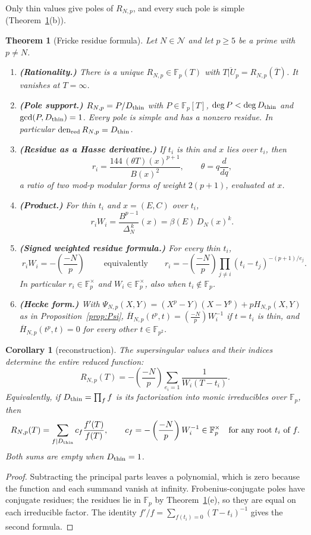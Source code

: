 \documentclass[11pt,a4paper]{article}
\numberwithin{equation}{section}
\newtheorem{corollary}[theorem]{Corollary}
\newtheorem{maintheorem}[theorem]{Theorem}
\theoremstyle{definition}
\theoremstyle{remark}
\newcommand{\Fp}{\mathbb F_p}
\newcommand{\Fq}{\mathbb F_{p^2}}
\newcommand{\den}{\operatorname{den}_{\mathrm{red}}}
\newcommand{\Lp}[1]{\left(\frac{#1}{p}\right)}
\begin{document}
Only thin values give poles of $R_{N,p}$, and every such pole is simple
(Theorem~\ref{thm:main}(b)).

\begin{maintheorem}[Fricke residue formula]\label{thm:main}
Let $N\in\mathcal N$ and let $p\ge5$ be a prime with $p\ne N$.
\begin{enumerate}[label=\textup{(\alph*)}]
\item \textbf{(Rationality.)} There is a unique $R_{N,p}\in\Fp(T)$ with $\overline{T|U_p}=R_{N,p}(\overline T)$. It vanishes at $T=\infty$.
\item \textbf{(Pole support.)} $R_{N,p}=P/D_{\rm thin}$ with $P\in\Fp[T]$,
$\deg P<\deg D_{\rm thin}$ and $\gcd(P,D_{\rm thin})=1$. Every pole is simple and has a nonzero residue. In particular $\den R_{N,p}=D_{\rm thin}$.
\item \textbf{(Residue as a Hasse derivative.)} If $t_i$ is thin and $x$ lies over $t_i$, then
\[
r_i=\frac{144\,(\theta T)(x)^{p+1}}{B(x)^2},\qquad \theta=q\frac{d}{dq},
\]
a ratio of two mod-$p$ modular forms of weight $2(p+1)$, evaluated at $x$.
\item \textbf{(Product.)} For thin $t_i$ and $x=(E,C)$ over $t_i$,
\[
r_iW_i=\frac{B^{p-1}}{\Delta_N^{\,k}}(x)=\beta(E)\,D_N(x)^k.
\]
\item \textbf{(Signed weighted residue formula.)} For every thin $t_i$,
\[
\boxed{\;r_iW_i=-\Lp{-N}\;}\qquad\text{equivalently}\qquad
r_i=-\Lp{-N}\prod_{j\ne i}(t_i-t_j)^{-(p+1)/e_j}.
\]
In particular $r_i\in\Fp^\times$ and $W_i\in\Fp^\times$, also when $t_i\notin\Fp$.
\item \textbf{(Hecke form.)} With $\Psi_{N,p}(X,Y)=(X^p-Y)(X-Y^p)+pH_{N,p}(X,Y)$ as in
Proposition~\ref{prop:Psi}, $\overline H_{N,p}(t^p,t)=\Lp{-N}W_i^{-1}$ if $t=t_i$ is thin, and
$\overline H_{N,p}(t^p,t)=0$ for every other $t\in\Fq$.
\end{enumerate}
\end{maintheorem}

\begin{corollary}[reconstruction]\label{cor:reconstruction}
The supersingular values and their indices determine the entire reduced function:
\begin{equation}\label{eq:partial-fractions}
R_{N,p}(T)=-\Lp{-N}\sum_{e_i=1}\frac{1}{W_i(T-t_i)}.
\end{equation}
Equivalently, if $D_{\rm thin}=\prod_f f$ is its factorization into monic
irreducibles over $\Fp$, then
\begin{equation}\label{eq:factor-reconstruction}
R_{N,p}(T)=\sum_{f\mid D_{\rm thin}} c_f\frac{f'(T)}{f(T)},\qquad
c_f=-\Lp{-N}W_i^{-1}\in\Fp^\times\quad\text{for any root }t_i\text{ of }f.
\end{equation}
Both sums are empty when $D_{\rm thin}=1$.
\end{corollary}
\begin{proof}
Subtracting the principal parts leaves a polynomial, which is zero because the
function and each summand vanish at infinity. Frobenius-conjugate poles have
conjugate residues; the residues lie in $\Fp$ by Theorem~\ref{thm:main}(e), so
they are equal on each irreducible factor. The identity
$f'/f=\sum_{f(t_i)=0}(T-t_i)^{-1}$ gives the second formula.
\end{proof}
\end{document}
